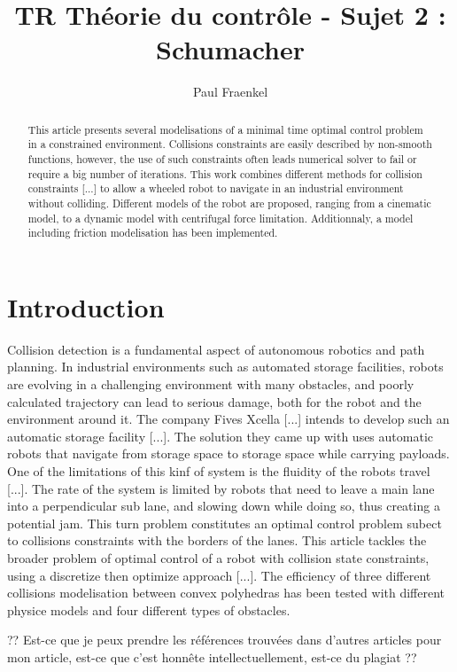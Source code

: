 \documentclass[a4paper]{article}
\title{TR Théorie du contrôle - Sujet 2 : Schumacher}
\author{Paul Fraenkel}
\date{}
\begin{document}
	
	\maketitle
	
	\begin{abstract}
		This article presents several modelisations of a minimal time optimal control problem in a constrained environment. Collisions constraints are easily described by non-smooth functions, however, the use of such constraints often leads numerical solver to fail or require a big number of iterations. This work combines different methods for collision constraints [...] to allow a wheeled robot to navigate in an industrial environment without colliding. Different models of the robot are proposed, ranging from a cinematic model, to a dynamic model with centrifugal force limitation. Additionnaly, a model including friction modelisation has been implemented.
	\end{abstract}
	
	\tableofcontents
	
	\part{Introduction}
	Collision detection is a fundamental aspect of autonomous robotics and path planning. In industrial environments such as automated storage facilities, robots are evolving in a challenging environment with many obstacles, and poorly calculated trajectory can lead to serious damage, both for the robot and the environment around it. The company Fives Xcella [...] intends to develop such an automatic storage facility [...]. The solution they came up with uses automatic robots that navigate from storage space to storage space while carrying payloads. One of the limitations of this kinf of system is the fluidity of the robots travel [...]. The rate of the system is limited by robots that need to leave a main lane into a perpendicular sub lane, and slowing down while doing so, thus creating a potential jam. This turn problem constitutes an optimal control problem subect to collisions constraints with the borders of the lanes. This article tackles the broader problem of optimal control of a robot with collision state constraints, using a discretize then optimize approach [...]. The efficiency of three different collisions modelisation between convex polyhedras has been tested with different physice models and four different types of obstacles.
	
	?? Est-ce que je peux prendre les références trouvées dans d'autres articles pour mon article, est-ce que c'est honnête intellectuellement, est-ce du plagiat ?? 
	
\end{document}
